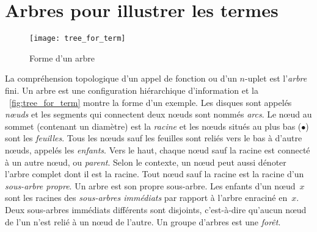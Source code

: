 \section{Arbres pour illustrer les termes}
\label{def:tree}

%
\begin{wrapfigure}[9]{r}[0pt]{0pt}
\centering
\texttt{[image: tree\_for\_term]}%
\caption{Forme d'un arbre}
\label{fig:tree_for_term}
\end{wrapfigure}
La compréhension topologique d'un appel de fonction ou d'un
\(n\)-uplet est l'\emph{arbre} fini. Un arbre est une
configuration hiérarchique d'information et la
\fig~\vref{fig:tree_for_term}
montre la forme d'un exemple. Les disques sont appelés
\emph{n{\oe}uds} et les segments qui connectent
deux n{\oe}uds sont nommés \emph{arcs}. Le n{\oe}ud
au sommet (contenant un diamètre) est la
\emph{racine} et les n{\oe}uds situés au
plus bas (\(\bullet\)) sont les
\emph{feuilles}. Tous les n{\oe}uds sauf
les feuilles sont reliés vers le bas à d'autre n{\oe}uds, appelés les
\emph{enfants}. Vers le haut, chaque
n{\oe}ud sauf la racine est connecté à un autre n{\oe}ud, ou
\emph{parent}. Selon le contexte, un
n{\oe}ud peut aussi dénoter l'arbre complet dont il est la
racine. Tout n{\oe}ud sauf la racine est la racine d'un
\emph{sous-arbre propre}. Un
arbre est son propre sous-arbre. Les enfants d'un n{\oe}ud~\(x\) sont
les racines des \emph{sous-arbres
  immédiats} par rapport à
l'arbre enraciné en~\(x\). Deux sous-arbres immédiats différents sont
disjoints, c'est-à-dire qu'aucun n{\oe}ud de l'un n'est relié à un
n{\oe}ud de l'autre. Un groupe d'arbres est une
\emph{forêt}.

